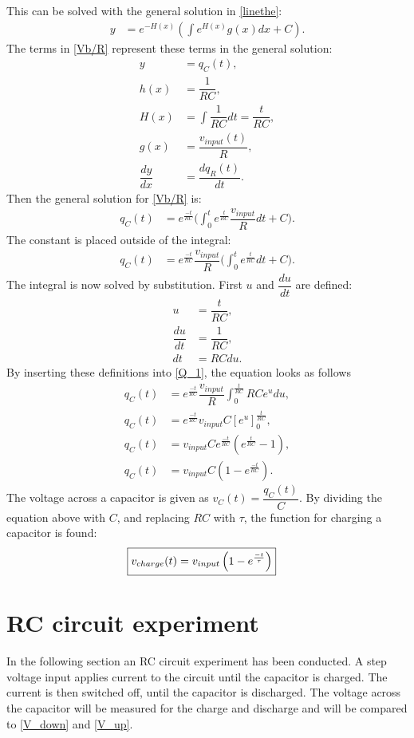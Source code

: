 This can be solved with the general solution in \cref{linethe}:
\begin{align*}
y&=e^{-H(x)}\left(\int e^{H(x)}g(x)dx+C\right).
\end{align*}
The terms in \eqref{Vb/R} represent these terms in the general solution:
\begin{align*}
y &= q_C(t),
\\
h(x) &= \dfrac{1}{RC},
\\
H(x) &= \int \dfrac{1}{RC}dt=\dfrac{t}{RC},
\\
g(x) &= \dfrac{v_{input}(t)}{R},
\\
\dfrac{dy}{dx} &= \dfrac{dq_R(t)}{dt}.
\end{align*}
Then the general solution for \eqref{Vb/R} is:
\begin{align*}
q_C(t) &= e^{\frac{-t}{RC}}\bigg(\int_{0}^{t}e^{\frac{t}{RC}}\dfrac{v_{input}}{R}dt+C\bigg).
\end{align*}
The constant is placed outside of the integral:
\begin{align}
q_C(t) &= e^{\frac{-t}{RC}}\dfrac{v_{input}}{R}\bigg(\int_{0}^{t}e^{\frac{t}{RC}}dt+C \bigg). \label{Q_1}
\end{align}
The integral is now solved by substitution. First $u$ and $\dfrac{du}{dt}$ are defined:
\begin{align*}
u &= \dfrac{t}{RC},
\\
\dfrac{du}{dt}&=\dfrac{1}{RC},
\\
dt &=RC du.
\end{align*} 
By inserting these definitions into \eqref{Q_1}, the equation looks as follows
\begin{align*}
q_C(t) &= e^{\frac{-t}{RC}}  \dfrac{v_{input}}{R} \int_{0}^{\frac{t}{RC}} R  C  e^u du,
\\
q_C(t) &= e^{\frac{-t}{RC}} v_{input} C \left[e^u\right]_{0}^{\frac{t}{RC}},
\\
q_C(t) &= v_{input}  C e^{\frac{-t}{RC}}\left(e^{\frac{t}{RC}}-1\right),
\\
q_C(t) &= v_{input}  C  \left(1-e^{\frac{-t}{RC}}\right).
\end{align*} 
The voltage across a capacitor is given as $v_C(t)=\dfrac{q_C(t)}{C}$. By dividing the equation above with $C$, and replacing $RC$ with $\tau$, the function for charging a capacitor is found:
\begin{align}
\label{V_up}
\Aboxed{
v_{charge}(t)=v_{input}\left(1-e^{\frac{-t}{\tau}}\right)
}
\end{align}
\section{RC circuit experiment} \label{c: RC_exp}
In the following section an RC circuit experiment has been conducted. A step voltage input applies current to the circuit until the capacitor is charged. The current is then switched off, until the capacitor is discharged. The voltage across the capacitor will be measured for the charge and discharge and will be compared to \eqref{V_down} and \eqref{V_up}.

